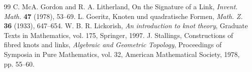 \documentclass[10pt,a4paper]{amsart}
\numberwithin{equation}{section}
\begin{document}
\begin{thebibliography}{99}
 C. McA. Gordon and R. A. Litherland, On the Signature of a Link, \emph{Invent. Math.} \textbf{47} (1978), 53--69.
 L. Goeritz, Knoten und quadratische Formen, \emph{Math. Z.} \textbf{36} (1933), 647--654.
 W. B. R. Lickorish, \emph{An introduction to knot theory}, Graduate Texts in Mathematics, vol. 175, Springer, 1997.
 J. Stallings, Constructions of fibred knots and links, \emph{Algebraic and Geometric Topology}, Proceedings of Symposia in Pure Mathematics, vol. 32, American Mathematical Society, 1978, pp. 55--60.
\end{thebibliography}
\end{document}
